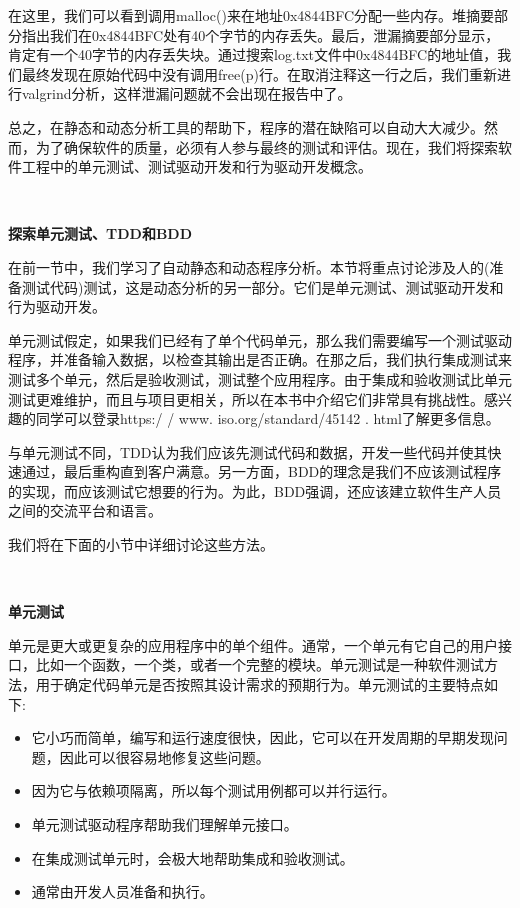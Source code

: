 在这里，我们可以看到调用malloc()来在地址0x4844BFC分配一些内存。堆摘要部分指出我们在0x4844BFC处有40个字节的内存丢失。最后，泄漏摘要部分显示，肯定有一个40字节的内存丢失块。通过搜索log.txt文件中0x4844BFC的地址值，我们最终发现在原始代码中没有调用free(p)行。在取消注释这一行之后，我们重新进行valgrind分析，这样泄漏问题就不会出现在报告中了。 \par
总之，在静态和动态分析工具的帮助下，程序的潜在缺陷可以自动大大减少。然而，为了确保软件的质量，必须有人参与最终的测试和评估。现在，我们将探索软件工程中的单元测试、测试驱动开发和行为驱动开发概念。 \par

\noindent\textbf{}\ \par
\textbf{探索单元测试、TDD和BDD} \ \par
在前一节中，我们学习了自动静态和动态程序分析。本节将重点讨论涉及人的(准备测试代码)测试，这是动态分析的另一部分。它们是单元测试、测试驱动开发和行为驱动开发。 \par
单元测试假定，如果我们已经有了单个代码单元，那么我们需要编写一个测试驱动程序，并准备输入数据，以检查其输出是否正确。在那之后，我们执行集成测试来测试多个单元，然后是验收测试，测试整个应用程序。由于集成和验收测试比单元测试更难维护，而且与项目更相关，所以在本书中介绍它们非常具有挑战性。感兴趣的同学可以登录https:/ / www. iso.org/standard/45142 . html了解更多信息。 \par
与单元测试不同，TDD认为我们应该先测试代码和数据，开发一些代码并使其快速通过，最后重构直到客户满意。另一方面，BDD的理念是我们不应该测试程序的实现，而应该测试它想要的行为。为此，BDD强调，还应该建立软件生产人员之间的交流平台和语言。 \par
我们将在下面的小节中详细讨论这些方法。 \par

\noindent\textbf{}\ \par
\textbf{单元测试} \ \par
单元是更大或更复杂的应用程序中的单个组件。通常，一个单元有它自己的用户接口，比如一个函数，一个类，或者一个完整的模块。单元测试是一种软件测试方法，用于确定代码单元是否按照其设计需求的预期行为。单元测试的主要特点如下: \par

\begin{itemize}
	\item 它小巧而简单，编写和运行速度很快，因此，它可以在开发周期的早期发现问题，因此可以很容易地修复这些问题。
	\item 因为它与依赖项隔离，所以每个测试用例都可以并行运行。
	\item 单元测试驱动程序帮助我们理解单元接口。
	\item 在集成测试单元时，会极大地帮助集成和验收测试。
	\item 通常由开发人员准备和执行。
\end{itemize}

